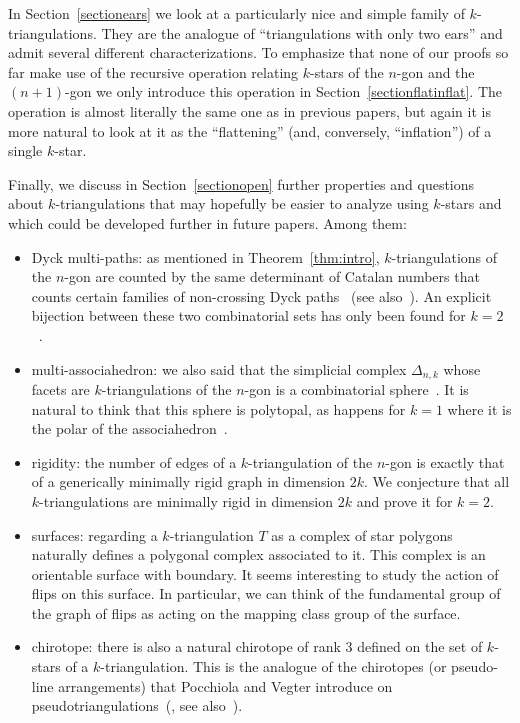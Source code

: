 \documentclass[12pt]{amsart}
\begin{document}
In Section~\ref{sectionears} we look at a particularly nice and simple family of $k$-triangulations. They are the analogue of ``triangulations with only two ears'' and admit several different characterizations. To emphasize that none of our proofs so far make use of the recursive operation relating $k$-stars of the $n$-gon and the $(n+1)$-gon we only introduce this operation in Section~\ref{sectionflatinflat}. The operation is almost literally the same one as in previous papers, but again it is more natural to look at it as the ``flattening'' (and, conversely, ``inflation'') of a single $k$-star.


Finally, we discuss in Section~\ref{sectionopen} further properties and questions about $k$-triangulations that may hopefully be easier to analyze using $k$-stars and which could be developed further in future papers. Among them:
\begin{itemize}
\item Dyck multi-paths: as mentioned in Theorem~\ref{thm:intro}, $k$-triangula\-tions of the $n$-gon are counted by the same determinant of Catalan numbers that counts certain families of non-crossing Dyck paths~\cite{j-gt-03,j-gtdfssp-05} (see also~\cite{k-gdidcffs-06, r-idsfmp-07}). An explicit bijection between these two combinatorial sets has only been found for $k=2$~\cite{e-btdp-06}.

\item multi-associahedron: we also said that the simplicial complex $\Delta_{n,k}$ whose facets are $k$-triangulations of the $n$-gon is a combinatorial sphere~\cite{j-gt-03}. It is natural to think that this sphere is polytopal, as happens for $k=1$ where it is the polar of the associahedron~\cite{l-at-89}.

\item rigidity: the number of edges of a $k$-triangulation of the $n$-gon is exactly that of a generically minimally rigid graph in dimension $2k$. We conjecture that all $k$-triangulations are minimally rigid in dimension $2k$ and prove it for $k=2$.

\item surfaces: regarding a $k$-triangulation $T$ as a complex of star polygons naturally defines a polygonal complex associated to it. This complex is an orientable surface with boundary. It seems interesting to study the action of flips on this surface. In particular, we can think of the fundamental group of the graph of flips as acting on the mapping class group of the surface.

\item chirotope: there is also a natural chirotope of rank $3$ defined on the set of $k$-stars of a $k$-triangulation. This is the analogue of the chirotopes (or pseudo-line arrangements) that Pocchiola and Vegter introduce on pseudotriangulations~(\cite{pv-ot-94}, see also~\cite{pv-vc-96}).
\end{itemize}
\end{document}
